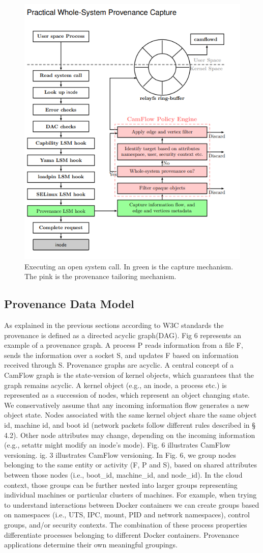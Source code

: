 \begin{figure}
	\centering
	\includegraphics[width=0.7\linewidth]{provenance-capture}
	\caption[open system call]{Executing an open system call. In green is the capture mechanism. The pink is the provenance tailoring mechanism.}
	\label{fig:provenance-capture}
\end{figure}
\subsection{Provenance Data Model}
As explained in the previous sections according to W3C standards the provenance is defined as a directed acyclic graph(DAG). Fig 6 represents an example of a provenance graph. A process P reads information from a file F, sends the information
over a socket S, and updates F based on information received
through S.
\vskip 0.1in 
Provenance graphs are acyclic. A central concept of a CamFlow
graph is the state-version of kernel objects, which guarantees that
the graph remains acyclic. A kernel object (e.g., an inode, a process
etc.) is represented as a succession of nodes, which represent an object changing state. We conservatively assume that any incoming
information flow generates a new object state. Nodes associated
with the same kernel object share the same object id, machine id,
and boot id (network packets follow different rules described in
§ 4.2). Other node attributes may change, depending on the incoming
information (e.g., setattr might modify an inode’s mode). Fig. 6 illustrates CamFlow versioning.
\vskip 0.1in
ig. 3 illustrates CamFlow versioning.
In Fig. 6, we group nodes belonging to the same entity or activity
(F, P and S), based on shared attributes between those nodes (i.e.,
boot\_id, machine\_id, and node\_id). In the cloud context,
those groups can be further nested into larger groups representing
individual machines or particular clusters of machines. For example,
when trying to understand interactions between Docker containers we can create groups based on namespaces (i.e., UTS, IPC,
mount, PID and network namespaces), control groups, and/or security contexts. The combination of these process properties differentiate processes belonging to different Docker containers. Provenance
applications determine their own meaningful groupings.

